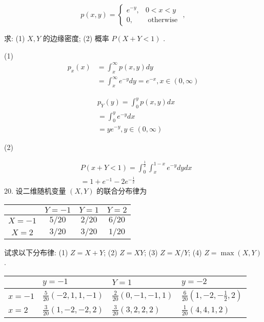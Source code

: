 \documentclass[14pt]{scrartcl} %
\numberwithin{equation}{section} %
\numberwithin{figure}{section} %
\numberwithin{table}{section} %
\begin{document}
	$$
	p(x, y)=\left\{\begin{array}{cc}
		e^{-y}, & 0<x<y \\
		0, & \text { otherwise }
	\end{array},\right.
	$$
	
	求: (1) $X, Y$ 的边缘密度; (2) 概率 $P(X+Y<1)$ .
	
	(1)
	$$
	\begin{aligned}
		p_{x}(x) & =\int_{x}^{\infty} p(x, y) d y \\
		& =\int_{x}^{\infty} e^{-y} d y=e^{-x}, x \in(0, \infty)
	\end{aligned}
	$$
	
	$$
	\begin{aligned}
		&p_Y(y)=\int_{0}^{y} p(x, y) d x \\
		& =\int_{0}^{y} e^{-y} d x \\
		& =y e^{-y}, y \in(0, \infty)
	\end{aligned}
	$$
	
	(2)
	
	\begin{align}
		&P(x+Y<1)=\int_{0}^{\frac{1}{2}} \int_{x}^{1-x} e^{-y} d y d x \\
		&=1+e^{-1}-2 e^{-\frac{1}{2}}
	\end{align}
	20. 设二维随机变量 $(X, Y)$ 的联合分布律为
	
	\begin{tabular}{|c|c|c|c|}
		\hline & $Y = -1$ & $Y = 1$ & $Y = 2$ \\
		\hline $X = -1$ & $5 / 20$ & $2 / 20$ & $6 / 20$ \\
		\hline $X = 2$ & $3 / 20$ & $3 / 20$ & $1 / 20$ \\
		\hline
	\end{tabular}
	
	试求以下分布律: (1) $Z=X+Y$; (2) $Z=X Y$; (3) $Z=X / Y$; (4) $Z=\max (X, Y)$ .
	
	\begin{center}
		\begin{tabular}{l|l|l|l}
			& $y=-1$ & $Y=1$ & $y=-2$ \\
			\hline
			$x=-1$ & $\frac{5}{20}(-2,1,1,-1)$ & $\frac{2}{20}(0,-1,-1,1)$ & $\frac{6}{20}\left(1,-2,-\frac{1}{2}, 2\right)$ \\
			\hline
			$x=2$ & $\frac{3}{20}(1,-2,-2,2)$ & $\frac{3}{20}(3,2,2,2)$ & $\frac{1}{20}(4,4,1,2)$ \\
			\hline
		\end{tabular}
	\end{center}
	
\end{document}
